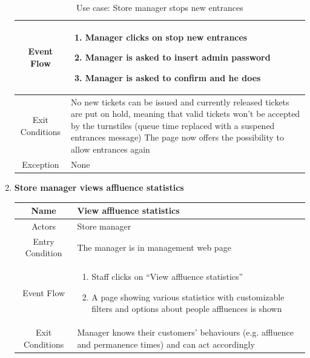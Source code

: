 \begin{enumerate}
\begin{table}[H]
{\begin{tabular}{|c|p{14cm}|}
			Event Flow & \begin{enumerate}
				\item Manager clicks on stop new entrances
				\item Manager is asked to insert admin password
				\item Manager is asked to confirm and he does
				
			\end{enumerate}\\
			
			\hline
			Exit Conditions & No new tickets can be issued and currently released tickets are put on hold, meaning that valid tickets won’t be accepted by the turnstiles (queue time replaced with a suspened entrances message)
			The page now offers the possibility to allow entrances again\\
			\hline
			
			Exception & None\\
			
			\hline
		\end{tabular}
	}
	\label{tab:UCManStop}
	\caption{Use case: Store manager stops new entrances}
\end{table}

\item \textbf{Store manager views affluence statistics}

\begin{table}[H]
	{
		\begin{tabular}{|c|p{14cm}|}
			\hline
			Name & View affluence statistics\\
			\hline
			Actors & Store manager\\
			\hline
			Entry Condition & The manager is in management web page\\
			\hline
			
			Event Flow & \begin{enumerate}
				\item Staff clicks on “View affluence statistics”
				\item A page showing various statistics with customizable filters and options about people affluences is shown
				
			\end{enumerate}\\
			
			\hline
			Exit Conditions & Manager knows their customers’ behaviours (e.g. affluence and permanence times) and can act accordingly\\
			\hline
			

\end{tabular}}
\end{table}
\end{enumerate}
